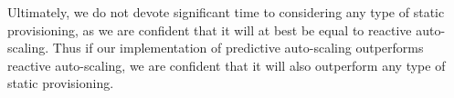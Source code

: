 Ultimately, we do not devote significant time to
considering any type of static provisioning, as we are confident that it will at
best be equal to reactive auto-scaling. Thus if our implementation of predictive
auto-scaling outperforms reactive auto-scaling, we are confident that it will
also outperform any type of static provisioning.
